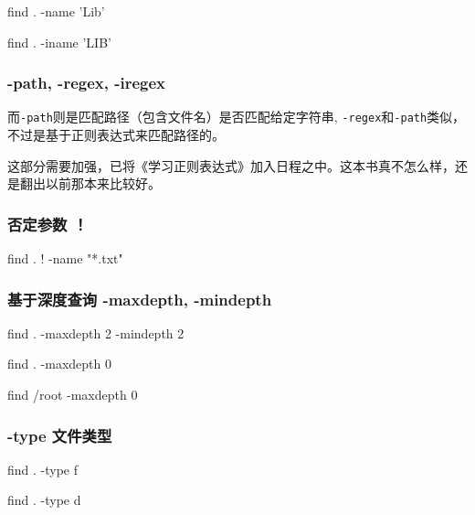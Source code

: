 \begin{Bash}[名字匹配指定的字符串]

find . -name 'Lib'

find . -iname 'LIB'

\end{Bash}


\subsubsection{ -path, -regex, -iregex}


而\lstinline$-path$则是匹配路径（包含文件名）是否匹配给定字符串, \lstinline$-regex$和\lstinline$-path$类似，不过是基于正则表达式来匹配路径的。

这部分需要加强，已将《学习正则表达式》加入日程之中。这本书真不怎么样，还是翻出以前那本来比较好。


\subsubsection{否定参数 ！}

\begin{Bash}

find . ! -name "*.txt"

\end{Bash}


\subsubsection{基于深度查询 -maxdepth, -mindepth}

\begin{Bash}[查找第二层目录的所有文件]

find . -maxdepth 2 -mindepth 2

\end{Bash}

\begin{Bash}

find . -maxdepth 0

find /root -maxdepth 0

\end{Bash}

\subsubsection{-type 文件类型}

\begin{Bash}

find . -type f 

find . -type d

\end{Bash}


